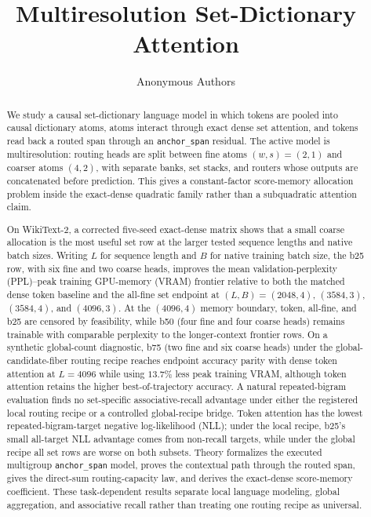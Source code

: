 \documentclass{article}
\title{Multiresolution Set-Dictionary Attention}
\author{Anonymous Authors}
\theoremstyle{plain}
\theoremstyle{definition}
\theoremstyle{remark}
\begin{document}
\maketitle

\begin{abstract}
We study a causal set-dictionary language model in which tokens are pooled into
causal dictionary atoms, atoms interact through exact dense set attention, and
tokens read back a routed span through an \texttt{anchor\_span} residual.  The
active model is multiresolution: routing heads are split between fine atoms
$(w,s)=(2,1)$ and coarser atoms $(4,2)$, with separate banks, set stacks, and
routers whose outputs are concatenated before prediction.  This gives a
constant-factor score-memory allocation problem inside the exact-dense
quadratic family rather than a subquadratic attention claim.

On WikiText-2, a corrected five-seed exact-dense matrix shows that a small
coarse allocation is the most useful set row at the larger tested sequence
lengths and native batch sizes.  Writing $L$ for sequence length and $B$ for
native training batch size, the b25 row, with six fine and two coarse heads, improves
the mean validation-perplexity (PPL)--peak training GPU-memory (VRAM) frontier
relative to both the matched dense token
baseline and the all-fine set endpoint at $(L,B)=(2048,4)$, $(3584,3)$,
$(3584,4)$, and $(4096,3)$.  At the $(4096,4)$ memory boundary, token, all-fine, and b25 are
censored by feasibility, while b50 (four fine and four coarse heads) remains trainable with comparable
perplexity to the longer-context frontier rows.  On a synthetic global-count
diagnostic, b75 (two fine and six coarse heads) under the
global-candidate-fiber routing recipe reaches endpoint accuracy parity
with dense token attention at $L=4096$ while using $13.7\%$ less peak training
VRAM, although token attention retains the higher best-of-trajectory accuracy.
A natural repeated-bigram evaluation finds no set-specific associative-recall
advantage under either the registered local routing recipe or a controlled
global-recipe bridge.  Token attention has the lowest repeated-bigram-target
negative log-likelihood (NLL); under the local recipe, b25's small all-target
NLL advantage comes from non-recall targets, while under the global recipe all
set rows are worse on both subsets.  Theory formalizes the
executed multigroup \texttt{anchor\_span} model, proves the contextual path
through the routed span, gives the direct-sum routing-capacity law, and derives
the exact-dense score-memory coefficient.  These task-dependent results
separate local language modeling, global aggregation, and associative recall
rather than treating one routing recipe as universal.
\end{abstract}
\end{document}
